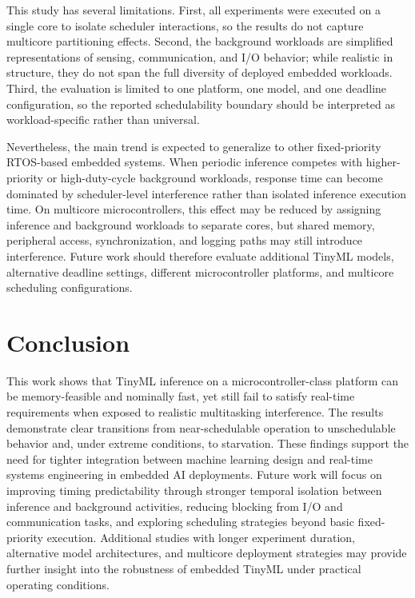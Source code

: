 \documentclass[conference]{IEEEtran}
\begin{document}
This study has several limitations. First, all experiments were executed on a single core to isolate scheduler interactions, so the results do not capture multicore partitioning effects. Second, the background workloads are simplified representations of sensing, communication, and I/O behavior; while realistic in structure, they do not span the full diversity of deployed embedded workloads. Third, the evaluation is limited to one platform, one model, and one deadline configuration, so the reported schedulability boundary should be interpreted as workload-specific rather than universal.

Nevertheless, the main trend is expected to generalize to other fixed-priority RTOS-based embedded systems. When periodic inference competes with higher-priority or high-duty-cycle background workloads, response time can become dominated by scheduler-level interference rather than isolated inference execution time. On multicore microcontrollers, this effect may be reduced by assigning inference and background workloads to separate cores, but shared memory, peripheral access, synchronization, and logging paths may still introduce interference. Future work should therefore evaluate additional TinyML models, alternative deadline settings, different microcontroller platforms, and multicore scheduling configurations.

\section{Conclusion} 
This work shows that TinyML inference on a microcontroller-class platform can be memory-feasible and nominally fast, yet still fail to satisfy real-time requirements when exposed to realistic multitasking interference. The results demonstrate clear transitions from near-schedulable operation to unschedulable behavior and, under extreme conditions, to starvation. These findings support the need for tighter integration between machine learning design and real-time systems engineering in embedded AI deployments. 
Future work will focus on improving timing predictability through stronger temporal isolation between inference and background activities, reducing blocking from I/O and communication tasks, and exploring scheduling strategies beyond basic fixed-priority execution. Additional studies with longer experiment duration, alternative model architectures, and multicore deployment strategies may provide further insight into the robustness of embedded TinyML under practical operating conditions.



\end{document}

